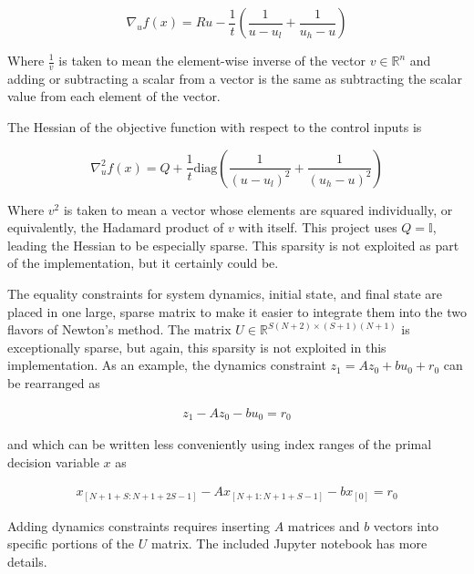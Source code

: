 \documentclass{exam}
\begin{document}
\begin{multicols}{2}
\begin{equation}
    \nabla_u f (x) = Ru - \frac{1}{t}\left( \frac{1}{u - u_l} + \frac{1}{u_h - u} \right)
\end{equation}

Where $\frac{1}{v}$ is taken to mean the element-wise inverse of the vector $v \in \mathbb{R}^{n}$ and adding or subtracting a scalar from a vector is the same as subtracting the scalar value from each element of the vector.

The Hessian of the objective function with respect to the control inputs is

\begin{equation}
    \nabla^2_u f (x) = Q + \frac{1}{t}\textrm{diag}\left( \frac{1}{(u - u_l)^2} + \frac{1}{(u_h - u)^2} \right)
\end{equation}

Where $v^2$ is taken to mean a vector whose elements are squared individually, or equivalently, the Hadamard product of $v$ with itself. This project uses $Q = \mathbb{I}$, leading the Hessian to be especially sparse. This sparsity is not exploited as part of the implementation, but it certainly could be. 

The equality constraints for system dynamics, initial state, and final state are placed in one large, sparse matrix to make it easier to integrate them into the two flavors of Newton's method. The matrix $U \in \mathbb{R}^{S(N + 2) \times (S + 1)(N + 1)}$ is exceptionally sparse, but again, this sparsity is not exploited in this implementation. As an example, the dynamics constraint $z_1 = A z_0 + b u_0 + r_0$ can be rearranged as

\begin{equation}
    \begin{aligned}
        z_1 - A z_0 - b u_0 = r_0
    \end{aligned}
\end{equation}

and which can be written less conveniently using index ranges of the primal decision variable $x$ as

\begin{equation}
    \begin{aligned}
        x_{[N+1 + S: N + 1 + 2S -1]} - A x_{[N+1: N + 1 + S -1]} - b x_{[0]} = r_0
    \end{aligned}
\end{equation}

Adding dynamics constraints requires inserting $A$ matrices and $b$ vectors into specific portions of the $U$ matrix. The included Jupyter notebook has more details.


\end{multicols}
\end{document}
